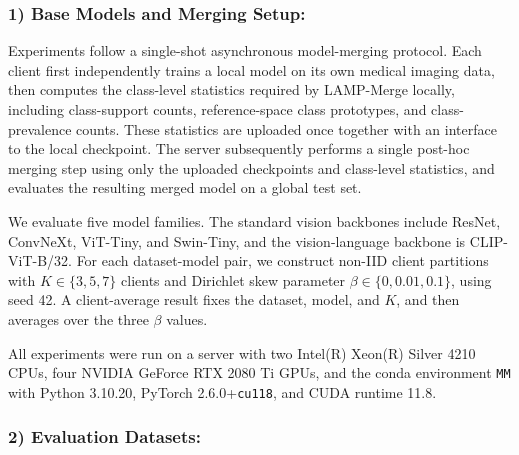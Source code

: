 \documentclass[letterpaper]{article} %
\begin{document}
\subsubsection{1) Base Models and Merging Setup:} 
Experiments follow a single-shot asynchronous model-merging protocol. Each client first independently trains a local model on its own medical imaging data, then computes the class-level statistics required by LAMP-Merge locally, including class-support counts, reference-space class prototypes, and class-prevalence counts. These statistics are uploaded once together with an interface to the local checkpoint. The server subsequently performs a single post-hoc merging step using only the uploaded checkpoints and class-level statistics, and evaluates the resulting merged model on a global test set.

We evaluate five model families. The standard vision backbones include ResNet, ConvNeXt, ViT-Tiny, and Swin-Tiny, and the vision-language backbone is CLIP-ViT-B/32. For each dataset-model pair, we construct non-IID client partitions with $K\in\{3,5,7\}$ clients and Dirichlet skew parameter $\beta\in\{0,0.01,0.1\}$, using seed 42\cite{hsu2019measuringeffectsnonidenticaldata}. A client-average result fixes the dataset, model, and $K$, and then averages over the three $\beta$ values.

All experiments were run on a server with two Intel(R) Xeon(R) Silver 4210 CPUs, four NVIDIA GeForce RTX 2080 Ti GPUs, and the conda environment \texttt{MM} with Python 3.10.20, PyTorch 2.6.0+\texttt{cu118}, and CUDA runtime 11.8.

\subsubsection{2) Evaluation Datasets:}
\end{document}
